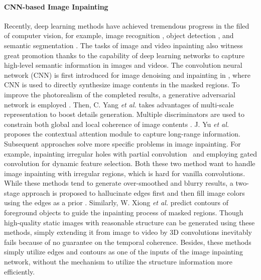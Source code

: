 \paragraph{CNN-based Image Inpainting}
Recently, deep learning methods have achieved  tremendous progress in the filed of computer vision, for example, image recognition \cite{krizhevsky2012imagenet,he2016deep}, object detection \cite{ren2015faster,redmon2016you}, and semantic segmentation \cite{long2015fully,chen2017deeplab}. 
The tasks of image and video inpainting also witness great promotion thanks to the capability of deep learning networks to capture high-level semantic information in images and videos.
%
The convolution neural network (CNN) is first introduced for image denoising and inpainting in \cite{xie2012image}, where CNN is used to directly synthesize image contents in the masked regions.
To improve the photorealism of the completed results, a generative adversarial network is employed \cite{pathak2016context}. 
Then, C. Yang \emph{et al.} \cite{yang2017high} takes advantages of multi-scale representation to boost details generation.
Multiple discriminators are used to constrain both global and local coherence of image contents \cite{iizuka2017globally}.  
J. Yu \emph{et al.} \cite{yu2018generative} proposes the contextual attention module to capture long-range information.
Subsequent approaches solve more specific problems in image inpainting. For example, inpainting irregular holes with partial convolution~\cite{liu2018partialinpainting} and employing gated convolution \cite{yu2018free} for dynamic feature selection. Both these two method want to handle image inpainting with irregular regions, which is hard for vanilla convolutions. 
%
While these methods tend to generate over-smoothed and blurry results, a two-stage approach is proposed to hallucinate edges first and then fill image colors using the edges as a prior \cite{nazeri2019edgeconnect}. Similarly, W. Xiong \emph{et al.} \cite{Xiong_2019_CVPR} predict contours of foreground objects to guide the inpainting process of masked regions.
Though high-quality static images with reasonable structure can be generated using these methods, simply extending it from image to video by 3D convolutions inevitably fails because of no guarantee on the temporal coherence. Besides, these methods simply utilize edges and contours as one of the inputs of the image inpainting network, without the mechanism to utilize the structure information more efficiently. 


